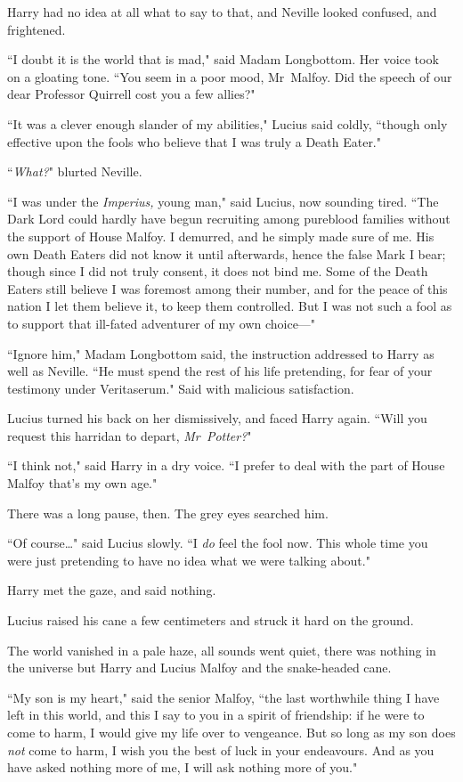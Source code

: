 Harry had no idea at all what to say to that, and Neville looked confused, and frightened.

``I doubt it is the world that is mad," said Madam Longbottom. Her voice took on a gloating tone. ``You seem in a poor mood, Mr~Malfoy. Did the speech of our dear Professor Quirrell cost you a few allies?"

``It was a clever enough slander of my abilities," Lucius said coldly, ``though only effective upon the fools who believe that I was truly a Death Eater."

``\emph{What?}" blurted Neville.

``I was under the \emph{Imperius,} young man," said Lucius, now sounding tired. ``The Dark Lord could hardly have begun recruiting among pureblood families without the support of House Malfoy. I demurred, and he simply made sure of me. His own Death Eaters did not know it until afterwards, hence the false Mark I bear; though since I did not truly consent, it does not bind me. Some of the Death Eaters still believe I was foremost among their number, and for the peace of this nation I let them believe it, to keep them controlled. But I was not such a fool as to support that ill-fated adventurer of my own choice—"

``Ignore him," Madam Longbottom said, the instruction addressed to Harry as well as Neville. ``He must spend the rest of his life pretending, for fear of your testimony under Veritaserum." Said with malicious satisfaction.

Lucius turned his back on her dismissively, and faced Harry again. ``Will you request this harridan to depart, \emph{Mr~Potter?}"

``I think not," said Harry in a dry voice. ``I prefer to deal with the part of House Malfoy that's my own age."

There was a long pause, then. The grey eyes searched him.

``Of course{\ldots}" said Lucius slowly. ``I \emph{do} feel the fool now. This whole time you were just pretending to have no idea what we were talking about."

Harry met the gaze, and said nothing.

Lucius raised his cane a few centimeters and struck it hard on the ground.

The world vanished in a pale haze, all sounds went quiet, there was nothing in the universe but Harry and Lucius Malfoy and the snake-headed cane.

``My son is my heart," said the senior Malfoy, ``the last worthwhile thing I have left in this world, and this I say to you in a spirit of friendship: if he were to come to harm, I would give my life over to vengeance. But so long as my son does \emph{not} come to harm, I wish you the best of luck in your endeavours. And as you have asked nothing more of me, I will ask nothing more of you."

